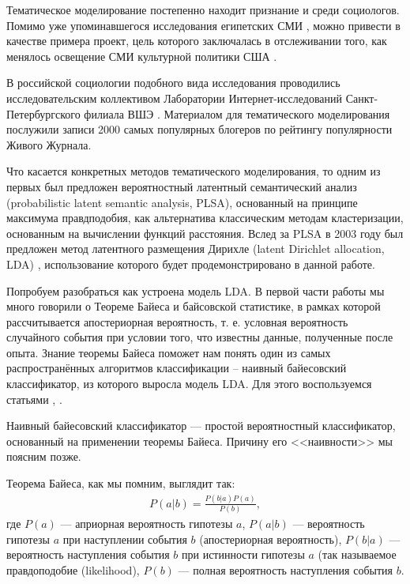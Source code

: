 Тематическое моделирование постепенно находит признание и среди социологов. Помимо уже упоминавшегося исследования египетских СМИ \cite{EgyptianUprising2012}, можно привести в качестве примера проект, цель которого заключалась в отслеживании того, как менялось освещение СМИ культурной политики США \cite{poetics_topics}.

В российской социологии подобного вида исследования проводились исследовательским коллективом Лаборатории Интернет-исследований Санкт-Петербургского филиала ВШЭ \cite{kolcovalda}. Материалом для тематического моделирования послужили записи 2000 самых популярных блогеров по рейтингу популярности Живого Журнала. %

Что касается конкретных методов тематического моделирования, то одним из первых был предложен вероятностный латентный семантический анализ (probabilistic latent semantic analysis, PLSA), основанный на принципе максимума правдподобия, как альтернатива классическим методам кластеризации, основанным на вычислении функций расстояния. Вслед за PLSA в 2003 году был предложен метод латентного размещения Дирихле (latent Dirichlet allocation, LDA) \cite{LDAOrigin}, использование которого будет продемонстрировано в данной работе.

Попробуем разобраться как устроена модель LDA. В первой части работы мы много говорили о Теореме Байеса и байсовской статистике, в рамках которой рассчитывается апостериорная вероятность, т. е. условная вероятность случайного события при условии того, что известны данные, полученные после опыта. Знание теоремы Байеса поможет нам понять один из самых распространённых алгоритмов классификации -- наивный байесовский классификатор, из которого выросла модель LDA. Для этого воспользуемся статьями \cite{surfburd_bies_lda}, \cite{bies_class}.

Наивный байесовский классификатор — простой вероятностный классификатор, основанный на применении теоремы Байеса. Причину его <<наивности>> мы поясним позже.

Теорема Байеса, как мы помним, выглядит так:
\begin{eqnarray}
P(a|b)=\frac{P(b|a)P(a)}{P(b)},
\end{eqnarray} 
где $P(a)$ --- априорная вероятность гипотезы $a$, $P(a|b)$ --- вероятность гипотезы $a$ при наступлении события $b$ (апостериорная вероятность), $P(b|a)$ --- вероятность наступления события $b$ при истинности гипотезы $a$ (так называемое правдоподобие (likelihood), $P(b)$ --- полная вероятность наступления события $b$. 


